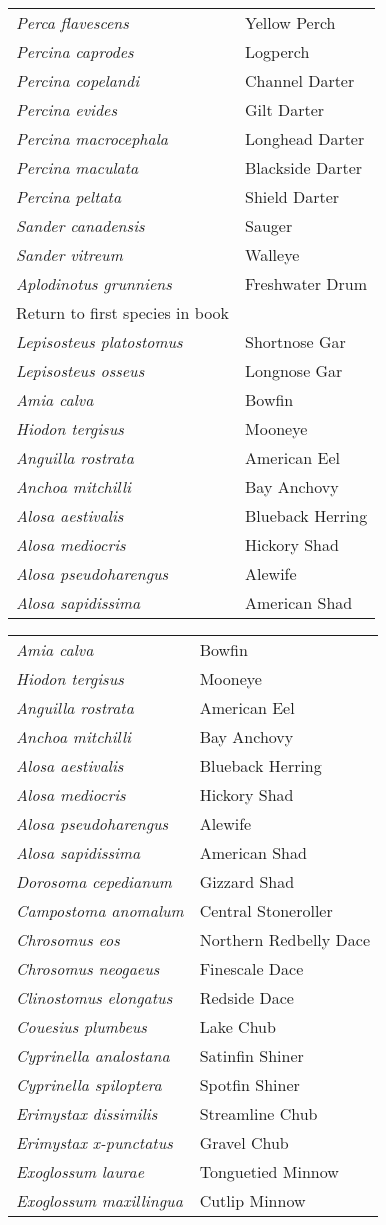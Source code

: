 \documentclass[11pt]{article}
\begin{document}
\vspace{\baselineskip}

%
\textbf{\Student}

\begin{tabular}{@{}L{3in}L{3in}@{}}
\textit{Perca flavescens} & Yellow Perch\tabularnewline
\textit{Percina caprodes} & Logperch\tabularnewline
\textit{Percina copelandi} & Channel Darter\tabularnewline
\textit{Percina evides} & Gilt Darter\tabularnewline
\textit{Percina macrocephala} & Longhead Darter\tabularnewline
\textit{Percina maculata} & Blackside Darter\tabularnewline
\textit{Percina peltata} & Shield Darter\tabularnewline
\textit{Sander canadensis} & Sauger\tabularnewline
\textit{Sander vitreum} & Walleye\tabularnewline
\textit{Aplodinotus grunniens} & Freshwater Drum\tabularnewline
\qquad Return to first species in book & \tabularnewline
\textit{Lepisosteus platostomus} & Shortnose Gar\tabularnewline
\textit{Lepisosteus osseus} & Longnose Gar\tabularnewline
\textit{Amia calva} & Bowfin\tabularnewline
\textit{Hiodon tergisus} & Mooneye\tabularnewline
\textit{Anguilla rostrata} & American Eel\tabularnewline
\textit{Anchoa mitchilli} & Bay Anchovy\tabularnewline
\textit{Alosa aestivalis} & Blueback Herring\tabularnewline
\textit{Alosa mediocris} & Hickory Shad\tabularnewline
\textit{Alosa pseudoharengus} & Alewife\tabularnewline
\textit{Alosa sapidissima} & American Shad\tabularnewline
\end{tabular}

\newpage

\vspace{\baselineskip}

%
\textbf{\Student}

\begin{tabular}{@{}L{3in}L{3in}@{}}
\textit{Amia calva} & Bowfin\tabularnewline
\textit{Hiodon tergisus} & Mooneye\tabularnewline
\textit{Anguilla rostrata} & American Eel\tabularnewline
\textit{Anchoa mitchilli} & Bay Anchovy\tabularnewline
\textit{Alosa aestivalis} & Blueback Herring\tabularnewline
\textit{Alosa mediocris} & Hickory Shad\tabularnewline
\textit{Alosa pseudoharengus} & Alewife\tabularnewline
\textit{Alosa sapidissima} & American Shad\tabularnewline
\textit{Dorosoma cepedianum} & Gizzard Shad\tabularnewline
\textit{Campostoma anomalum} & Central Stoneroller\tabularnewline
\textit{Chrosomus eos} & Northern Redbelly Dace\tabularnewline
\textit{Chrosomus neogaeus} & Finescale Dace\tabularnewline
\textit{Clinostomus elongatus} & Redside Dace\tabularnewline
\textit{Couesius plumbeus} & Lake Chub\tabularnewline
\textit{Cyprinella analostana} & Satinfin Shiner\tabularnewline
\textit{Cyprinella spiloptera} & Spotfin Shiner\tabularnewline
\textit{Erimystax dissimilis} & Streamline Chub\tabularnewline
\textit{Erimystax x-punctatus} & Gravel Chub\tabularnewline
\textit{Exoglossum laurae} & Tonguetied Minnow\tabularnewline
\textit{Exoglossum maxillingua} & Cutlip Minnow\tabularnewline
\end{tabular}
\end{document}
